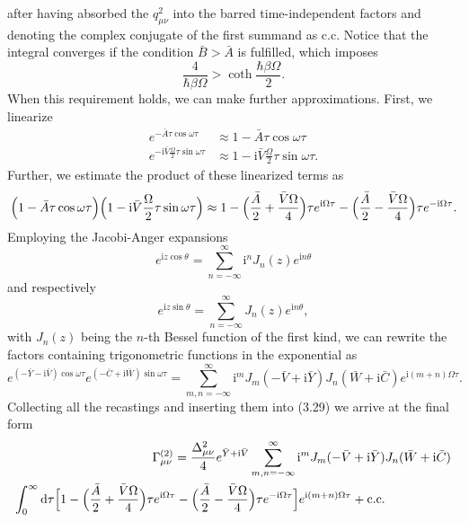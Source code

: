 %
after having absorbed the $q_{\mu\nu}^2$ into the barred time-independent factors and denoting
the complex conjugate of the first summand as c.c. Notice that the integral converges
if the condition $\bar{B}>\bar{A}$ is fulfilled, which imposes
%
\begin{equation}
    \frac{4}{\hbar\beta\Omega}>\coth\frac{\hbar\beta\Omega}{2}.
\end{equation}
%
When this requirement holds, we can make further approximations. First, we linearize
%
\begin{align}
    e^{ -\bar{A} \tau \cos\omega\tau} &\approx 1-\bar{A}\tau\cos\omega\tau \\
    e^{-\text{i}\bar{V} \frac{\Omega}{2} \tau\sin\omega\tau} &\approx 1-\text{i}\bar{V} \frac{\Omega}{2} \tau\sin\omega\tau.
\end{align}
%
Further, we estimate the product of these linearized terms as
%
\begin{equation}
    \Bigl(1-\bar{A}\tau\cos\omega\tau\Bigr)\Bigl(1-\text{i}\bar{V}\frac{\Omega}{2}\tau\sin\omega\tau\Bigr)
    \approx 1-\Bigl(\frac{\bar{A}}{2}+\frac{\bar{V}\Omega}{4}\Bigr)\tau e^{\text{i}\Omega\tau}
    -\Bigl(\frac{\bar{A}}{2}-\frac{\bar{V}\Omega}{4}\Bigr)\tau e^{-\text{i}\Omega\tau}.
\end{equation}
%
Employing the Jacobi-Anger expansions
%
\begin{equation}
    e^{\text{i}z\cos\theta} = \sum_{n=-\infty}^{\infty}\text{i}^n J_n(z)e^{\text{i}n\theta}
\end{equation}
%
and respectively
%
\begin{equation}
    e^{\text{i}z\sin\theta} = \sum_{n=-\infty}^{\infty}J_n(z)e^{\text{i}n\theta},
\end{equation}
%
with $J_n(z)$ being the $n$-th Bessel function of the first kind, we can rewrite the factors
containing trigonometric functions in the exponential as 
%
\begin{equation}
    e^{(-\bar{Y}-\text{i}\bar{V})\cos\omega\tau}e^{(-\bar{C}+\text{i}\bar{W})\sin\omega\tau}
    = \sum_{m,n=-\infty}^{\infty}\text{i}^m J_m(-\bar{V}+\text{i}\bar{Y})J_n(\bar{W}+\text{i}\bar{C})
    e^{\text{i}(m+n)\Omega\tau}.
\end{equation}
%
Collecting all the recastings and inserting them into (3.29) we arrive at the final form
%
\begin{align}
    \Gamma_{\mu\nu}^{(2)} = \frac{\Delta_{\mu\nu}^2}{4} e^{ \bar{Y} + \text{i} \bar{V}}
    \sum_{m,n=-\infty}^{\infty}\text{i}^m J_m(-\bar{V}+\text{i}\bar{Y})&J_n(\bar{W}+\text{i}\bar{C}) \\
    \int_{0}^{\infty}\text{d}\tau
    \Bigl[ 1-\Bigl(\frac{\bar{A}}{2}+\frac{\bar{V}\Omega}{4}\Bigr)\tau e^{\text{i}\Omega\tau}
    -\Bigl(\frac{\bar{A}}{2}-\frac{\bar{V}\Omega}{4}\Bigr)\tau e^{-\text{i}\Omega\tau}\Bigr]
    e^{\text{i}(m+n)\Omega\tau} + \text{c.c}.
\end{align}
